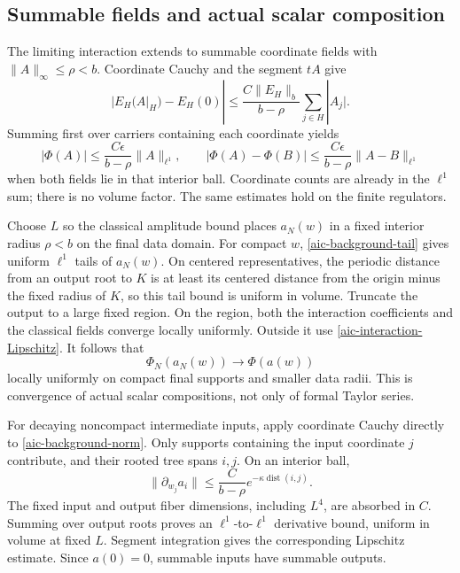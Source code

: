 \subsection{Summable fields and actual scalar composition}
\label{aic-composition-section}

The limiting interaction extends to summable coordinate fields
with \(\|A\|_\infty\le\rho<b\). Coordinate Cauchy and the
segment \(tA\) give
\[
 |E_H(A|_H)-E_H(0)|
 \le\frac{C\|E_H\|_b}{b-\rho}
                         \sum_{j\in H}|A_j|.
\]
Summing first over carriers containing each coordinate yields
\begin{equation}
 |\Phi(A)|\le\frac{C\epsilon}{b-\rho}\|A\|_{\ell^1},
 \qquad
 |\Phi(A)-\Phi(B)|
       \le\frac{C\epsilon}{b-\rho}\|A-B\|_{\ell^1}
 \label{aic-interaction-Lipschitz}
\end{equation}
when both fields lie in that interior ball. Coordinate counts
are already in the \(\ell^1\) sum; there is no volume factor.
The same estimates hold on the finite regulators.

Choose \(L\) so the classical amplitude bound places \(a_N(w)\)
in a fixed interior radius \(\rho<b\) on the final data domain.
For compact \(w\), \eqref{aic-background-tail} gives uniform
\(\ell^1\) tails of \(a_N(w)\). On centered representatives,
the periodic distance from an output root to \(K\) is at least
its centered distance from the origin minus the fixed radius
of \(K\), so this tail bound is uniform in volume.
Truncate the output to a large fixed region. On the region,
both the interaction coefficients and the classical fields
converge locally uniformly. Outside it use
\eqref{aic-interaction-Lipschitz}. It follows that
\begin{equation}
 \Phi_N(a_N(w))\longrightarrow\Phi(a(w))
 \label{aic-substitution-limit}
\end{equation}
locally uniformly on compact final supports and smaller data
radii. This is convergence of actual scalar compositions,
not only of formal Taylor series.

For decaying noncompact intermediate inputs, apply coordinate
Cauchy directly to \eqref{aic-background-norm}. Only supports
containing the input coordinate \(j\) contribute, and their
rooted tree spans \(i,j\). On an interior ball,
\begin{equation}
 \|\partial_{w_j}a_i\|
     \le\frac{C}{b-\rho}
                   e^{-\kappa\operatorname{dist}(i,j)}.
 \label{aic-map-derivative}
\end{equation}
The fixed input and output fiber dimensions, including \(L^4\),
are absorbed in \(C\). Summing over output roots proves an
\(\ell^1\)-to-\(\ell^1\) derivative bound, uniform in volume
at fixed \(L\). Segment integration gives the corresponding
Lipschitz estimate. Since \(a(0)=0\), summable inputs have
summable outputs.

